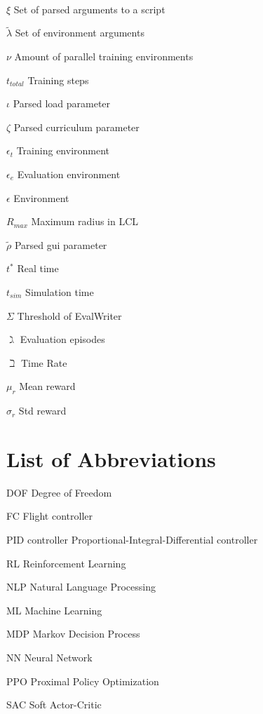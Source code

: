 \documentclass[bachelor,english]{infothesis}
\begin{document}
\begin{description}
	\\
	\item $\xi$ \dotfill Set of parsed arguments to a script
	\item $\tilde{\lambda}$ \dotfill Set of environment arguments
	\item $\nu$ \dotfill Amount of parallel training environments
	\item $t_{total}$ \dotfill Training steps
	\item $\iota$ \dotfill Parsed load parameter
	\item $\zeta$ \dotfill Parsed curriculum parameter
	\item  $\epsilon_t$ \dotfill Training environment
	\item $\epsilon_e$ \dotfill Evaluation environment
	\item $\epsilon$ \dotfill Environment
	\item $R_{max}$ \dotfill Maximum radius in LCL
	\item $\tilde{\rho}$ \dotfill Parsed gui parameter
	\item $t^*$ \dotfill Real time
	\item  $t_{sim}$ \dotfill Simulation time
	\item $\Sigma$ \dotfill Threshold of EvalWriter
	\item $\gimel$ \dotfill Evaluation episodes
	\item $\beth$ \dotfill Time Rate
	\item $\mu_r$ \dotfill Mean reward
	\item $\sigma_r$ \dotfill Std reward
\end{description}

\chapter*{List of Abbreviations}

\begin{description}
	\item DOF \dotfill Degree of Freedom
	\item FC \dotfill Flight controller
	\item PID controller \dotfill Proportional-Integral-Differential controller
	\item RL \dotfill Reinforcement Learning
	\item NLP \dotfill Natural Language Processing
	\item ML \dotfill Machine Learning
	\item MDP \dotfill Markov Decision Process
	\item NN \dotfill Neural Network
	\item PPO \dotfill Proximal Policy Optimization
	\item SAC \dotfill Soft Actor-Critic
\end{description}


\clearpage


\end{document}
